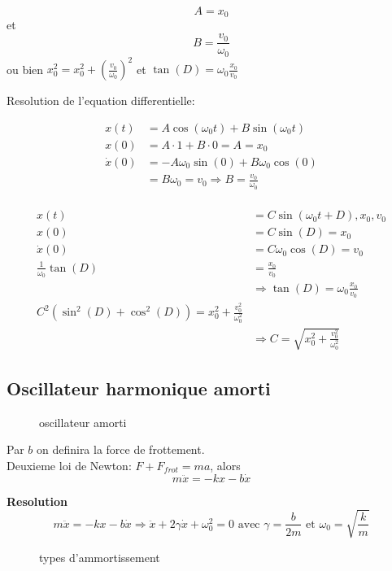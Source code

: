 \documentclass[../main.tex]{subfiles}
\begin{document}
\[ 
A=x_0
\]
et 
\[ 
B= \frac{v_0}{\omega_0}
\]
ou bien
$ x_0^{2}=x_0^{2}+ (\frac{v_0}{\omega_0})^{2}$ et $\tan(D)= \omega_0\frac{x_0}{v_0}$

Resolution de l'equation differentielle:

\begin{align*}
	x(t) &= A\cos(\omega_0 t) + B \sin(\omega_0t)\\
x(0) &= A \cdot 1 + B \cdot 0 = A = x_0\\
\dot{x}(0) &= -A \omega_0 \sin(0) + B \omega_0 \cos(0)\\
	   &= B \omega_0 = v_0 \Rightarrow B = \frac{v_0}{\omega_0}
\end{align*}
\hr\\
\begin{align*}
	x(t) &= C \sin(\omega_0t+ D), x_0,v_0\\
	x(0)&= C \sin(D) = x_0\\
	\dot{x}(0) &= C\omega_0\cos(D)=v_0\\
	\frac{1}{\omega_0} \tan(D) &= \frac{x_0}{v_0}\\
				   &\Rightarrow \tan(D) = \omega_0 \frac{x_0}{v_0}\\
				   C^{2}(\sin^{2}(D) + \cos^{2}(D)) = x_0^{2} + \frac{v_0^{2}}{\omega_0^{2}}\\
				   &\Rightarrow C= \sqrt{x_0^{2} + \frac{v_0^{2}}{\omega_0^{2}}}
\end{align*}
\subsection{Oscillateur harmonique amorti}
\begin{figure}[H]
    \centering
    \caption{oscillateur amorti}
    \label{fig:oscillateur-amorti}
\end{figure}
Par $b$ on definira la force de frottement.\\
Deuxieme loi de Newton: $F+F_{frot}=ma$, alors
\[ 
	m\ddot{x} = -kx - b\dot{x}
\]

\textbf{Resolution}\\

\[ 
	m\ddot{x} = -kx - b\dot{x} \Rightarrow \ddot{x} + 2\gamma \dot{x} + \omega_0^{2}=0 \text{ avec } \gamma=\frac{b}{2m} \text{ et } \omega_0=\sqrt{\frac{k}{m}}
\]
\begin{figure}[ht]
    \centering
    \caption{types d'ammortissement}
    \label{fig:types-d'ammortissement}
\end{figure}
\end{document}
